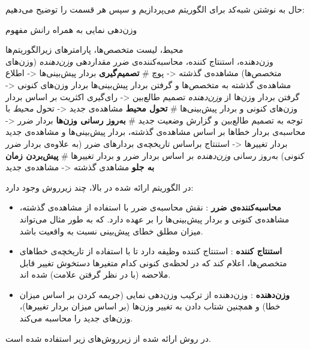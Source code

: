حال به نوشتن شبه‌کد برای الگوریتم می‌پردازیم و سپس هر قسمت را توضیح می‌دهیم:
\begin{algorithm}[H]
\caption{
وزن‌دهی نمایی به همراه رانش مفهوم
}
\begin{algorithmic}[1]
\REQUIRE
محیط، لیست متخصص‌ها، پارامترهای زیرالگوریتم‌ها\\
وزن‌دهنده، استنتاج کننده، محاسبه‌کننده‌ی ضرر
  \STATE
  مقداردهی 
  \textit{
  وزن‌دهنده
  }
  (وزن‌های متخصص‌ها)
  \STATE 
  مشاهده‌ی گذشته <- پوچ
  \STATE 
  \# \textbf{
  تصمیم‌گیری
  }
  \STATE 
  بردار پیش‌بینی‌ها <- اطلاع مشاهده‌ی گذشته به متخصص‌ها و گرفتن بردار پیش‌بینی‌ها
  \STATE 
  بردار وزن‌های کنونی <- گرفتن بردار وزن‌ها از 
  \textit{
  وزن‌دهنده
  }
  \STATE
  تصمیم طالع‌بین <- رای‌گیری اکثریت بر اساس بردار وزن‌های کنونی و بردار پیش‌بینی‌ها
  \STATE 
  \# \textbf{
  تحول محیط
  }
  \STATE 
  مشاهده‌ی جدید <- تحول 
  \textit{
  محیط
  } 
  با توجه به تصمیم طالع‌بین و گزارش وضعیت جدید
  \STATE 
  \# \textbf{
  به‌روز رسانی وزن‌ها
  }
  \STATE 
  بردار ضرر <- محاسبه‌ی بردار خطاها بر اساس مشاهده‌ی گذشته، بردار پیش‌بینی‌ها و مشاهده‌ی جدید
  \STATE 
  بردار تغییرها <- استنتاج براساس تاریخچه‌ی بردارهای ضرر (به علاوه‌ی بردار ضرر کنونی)
  \STATE 
  به‌روز رسانی 
  \textit{
  وزن‌دهنده
  } 
  بر اساس بردار ضرر و بردار تغییرها
  \STATE 
  \# \textbf{
  پیش‌بردن زمان به جلو
  }
  \STATE 
  مشاهد‌ی گذشته <- مشاهده‌ی جدید
  \ENDWHILE
\end{algorithmic}
\end{algorithm}

در الگوریتم ارائه شده در بالا، چند زیرروش وجود دارد:
\begin{itemize}
\item \textbf{
محاسبه‌کننده‌ی ضرر
}: نقش محاسبه‌ی ضرر
با استفاده از مشاهده‌ی گذشته، مشاهده‌ی کنونی و بردار پیش‌بینی‌ها را بر عهده دارد. که به طور مثال می‌تواند میزان مطلق خطای پیش‌بینی نسبت به واقعیت باشد.

\item \textbf{
استنتاج کننده
}: استنتاج کننده وظیفه دارد تا با استفاده از تاریخچه‌ی خطاهای متخصص‌ها، اعلام کند که در لحظه‌ی کنونی کدام متغیرها دستخوش تغییر قابل ملاحضه (با در نظر گرفتن علامت) شده اند.

\item \textbf{
وزن‌دهنده
}: وزن‌دهنده از ترکیب وزن‌دهی نمایی (جریمه کردن بر اساس میزان خطا) و همچنین شتاب دادن به تغییر وزن‌ها (بر اساس میزان بردار تغییرها)، وزن‌های جدید را محاسبه می‌کند.
\end{itemize}

در روش ارائه شده از زیرروش‌های زیر استفاده شده است.



